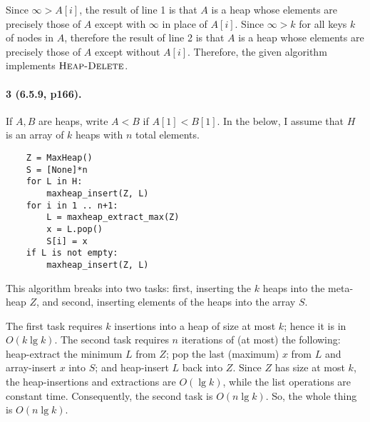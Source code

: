 \documentclass[
]{article}
\begin{document}
Since $\infty>A[i]$, the result of line 1 is that $A$ is a heap whose elements are precisely those of $A$ except with $\infty$ in place of $A[i]$.  Since $\infty>k$ for all keys $k$ of nodes in $A$, therefore the result of line 2 is that $A$ is a heap whose elements are precisely those of $A$ except without $A[i]$.  Therefore, the given algorithm implements $\textsc{Heap-Delete}$.

\paragraph{3 (6.5.9, p166).} If $A,B$ are heaps, write $A<B$ if $A[1]<B[1]$.
In the below, I assume that $H$ is an array of $k$ heaps with $n$ total elements.
\begin{verbatim}
    Z = MaxHeap()
    S = [None]*n
    for L in H:
        maxheap_insert(Z, L)
    for i in 1 .. n+1:
        L = maxheap_extract_max(Z)
        x = L.pop()
        S[i] = x
    if L is not empty:
        maxheap_insert(Z, L)
\end{verbatim}
This algorithm breaks into two tasks: first, inserting the $k$ heaps into the meta-heap $Z$, and second, inserting elements of the heaps into the array $S$.  

The first task requires $k$ insertions into a heap of size at most $k$; hence it is in $O(k\lg k)$.  The second task requires $n$ iterations of (at most) the following: heap-extract the minimum $L$ from $Z$; pop the last (maximum) $x$ from $L$ and array-insert $x$ into $S$; and heap-insert $L$ back into $Z$.  Since $Z$ has size at most $k$, the heap-insertions and extractions are $O(\lg k)$, while the list operations are constant time.  Consequently, the second task is $O(n\lg k)$.  So, the whole thing is $O(n\lg k)$.
\end{document}
